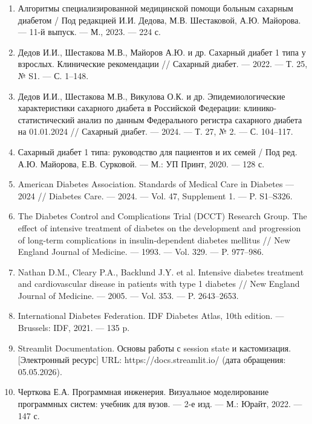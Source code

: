 \documentclass[14pt, a4paper]{extarticle}
\begin{document}
\begin{enumerate}
\item Алгоритмы специализированной медицинской помощи больным сахарным диабетом / Под редакцией И.И. Дедова, М.В. Шестаковой, А.Ю. Майорова. — 11-й выпуск. — М., 2023. — 224 с.

\item Дедов И.И., Шестакова М.В., Майоров А.Ю. и др. Сахарный диабет 1 типа у взрослых. Клинические рекомендации // Сахарный диабет. — 2022. — Т. 25, № S1. — С. 1–148.

\item Дедов И.И., Шестакова М.В., Викулова О.К. и др. Эпидемиологические характеристики сахарного диабета в Российской Федерации: клинико-статистический анализ по данным Федерального регистра сахарного диабета на 01.01.2024 // Сахарный диабет. — 2024. — Т. 27, № 2. — С. 104–117.

\item Сахарный диабет 1 типа: руководство для пациентов и их семей / Под ред. А.Ю. Майорова, Е.В. Сурковой. — М.: УП Принт, 2020. — 128 с.

\item American Diabetes Association. Standards of Medical Care in Diabetes — 2024 // Diabetes Care. — 2024. — Vol. 47, Supplement 1. — P. S1–S326.

\item The Diabetes Control and Complications Trial (DCCT) Research Group. The effect of intensive treatment of diabetes on the development and progression of long-term complications in insulin-dependent diabetes mellitus // New England Journal of Medicine. — 1993. — Vol. 329. — P. 977–986.

\item Nathan D.M., Cleary P.A., Backlund J.Y. et al. Intensive diabetes treatment and cardiovascular disease in patients with type 1 diabetes // New England Journal of Medicine. — 2005. — Vol. 353. — P. 2643–2653.

\item International Diabetes Federation. IDF Diabetes Atlas, 10th edition. — Brussels: IDF, 2021. — 135 p.

\item Streamlit Documentation. Основы работы с session state и кастомизация. [Электронный ресурс] URL: https://docs.streamlit.io/ (дата обращения: 05.05.2026).

\item Черткова Е.А. Программная инженерия. Визуальное моделирование программных систем: учебник для вузов. — 2-е изд. — М.: Юрайт, 2022. — 147 с.


\end{enumerate}
\end{document}
